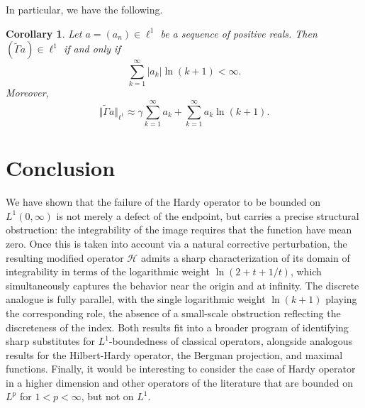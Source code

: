 \documentclass[12pt,a4paper]{amsart}
\newtheorem{corollary}[theorem]{Corollary}
\theoremstyle{definition}
\begin{document}
In particular, we have the following.
\begin{corollary}\label{cor:main2}
Let $a=(a_n)\in\ell^1$ be a sequence of positive reals.  Then $(\tilde{\Gamma}a)\in\ell^1$ if and only if
\begin{equation*}
  \sum_{k=1}^\infty |a_k|\ln(k+1) < \infty.
\end{equation*}
Moreover,
$$\Vert\tilde{\Gamma}a\Vert_{\ell^1}\approx \gamma\sum_{k=1}^\infty a_k+\sum_{k=1}^\infty a_k\ln(k+1).$$
\end{corollary}
\section{Conclusion}
We have shown that the failure of the Hardy operator to be bounded
on $L^1(0,\infty)$ is not merely a defect of the endpoint, but
carries a precise structural obstruction: the integrability of the image requires that the function have mean zero. Once this is taken
into account via a natural corrective perturbation, the resulting modified
operator $\mathcal{H}$ admits a sharp characterization of its
domain of integrability in terms of the logarithmic weight
$\ln(2+t+1/t)$, which simultaneously captures the behavior near
the origin and at infinity. The discrete analogue is fully parallel,
with the single logarithmic weight $\ln(k+1)$ playing the
corresponding role, the absence of a small-scale obstruction
reflecting the discreteness of the index. Both results fit into
a broader program of identifying sharp substitutes for
$L^1$-boundedness of classical operators, alongside analogous
results for the Hilbert-Hardy operator, the Bergman projection, and
maximal functions. Finally, it would be interesting to consider the case of Hardy operator in a higher dimension and other operators of the literature that are bounded on $L^p$ for $1<p<\infty$, but not on $L^{1}$.

\medskip
\end{document}
